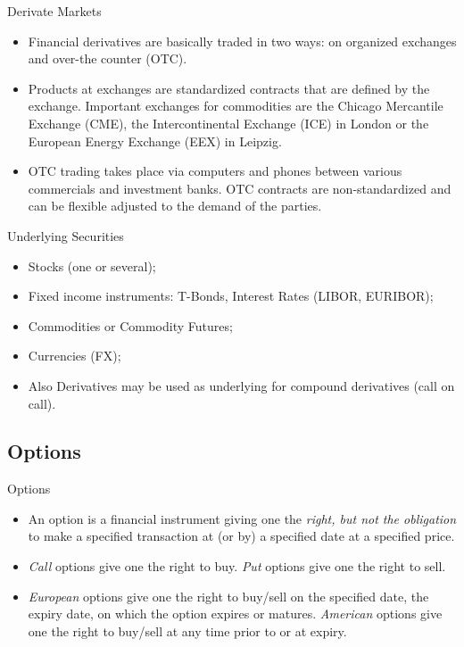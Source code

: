 {Derivate Markets}
\begin{itemize}
  \item<1-> Financial derivatives are basically traded in two ways: on organized exchanges and over-the counter (OTC).
  \item<2-> Products at exchanges are standardized contracts that are defined by the exchange. Important exchanges for commodities are the Chicago Mercantile Exchange (CME), the Intercontinental Exchange (ICE) in London or the European Energy Exchange (EEX) in Leipzig.
  \item<3-> OTC trading takes place via computers and phones between various commercials and investment banks. OTC contracts are non-standardized and can be flexible adjusted to the demand of the parties.
\end{itemize}




{Underlying Securities}

\begin{itemize}
\item<1-> Stocks (one or several);
\item<2-> Fixed income instruments: T-Bonds, Interest Rates (LIBOR, EURIBOR);
\item<3-> Commodities or Commodity Futures;
\item<4-> Currencies (FX);
\item<5-> Also Derivatives may be used as underlying for compound derivatives (call on call).
\end{itemize}




\subsection{Options}

{Options}

\begin{itemize}
 \item<1->  An option is a financial instrument giving one the {\it right, but
not the obligation} to make a specified transaction at (or by) a
specified date at a specified price.
\item<2->{\it Call} options give one
the right to buy. {\it Put} options give one the right to sell.
\item<3-> {\it European} options give one the right to buy/sell on the
specified date, the expiry date, on which the option expires or
matures. {\it American} options give one the right to buy/sell at any time
prior to or at expiry.
\end{itemize}



